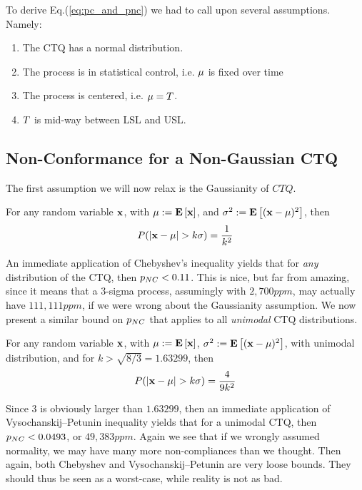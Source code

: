 To derive Eq.(\ref{eq:pc_and_pnc}) we had to call upon several assumptions.
Namely:
\begin{enumerate}
\item The CTQ has a normal distribution.
\item The process is in statistical control, i.e. $\mu$ is fixed over time
\item The process is centered, i.e. $\mu=T$.
\item $T$ is mid-way between LSL and USL.
\end{enumerate}








\subsection{Non-Conformance for a Non-Gaussian CTQ}
The first assumption we will now relax is the Gaussianity of $CTQ$. 

\begin{theorem}
For any random variable $\mathbf{x}$, with $\mu:=\mathbf{E}\left[ \mathbf{x} \right]$, and $\sigma^2:=\mathbf{E}\left[ (\mathbf{x}-\mu)^2 \right]$, then
\begin{align}
	P(|\x-\mu|>k\sigma)=\frac{1}{k^2}
\end{align}
\end{theorem}
An immediate application of Chebyshev's inequality yields that for \emph{any} distribution of the CTQ, then $p_{NC}<0.11$.
This is nice, but far from amazing, since it means that a 3-sigma process, assumingly with $2,700 ppm$, may actually have $111,111 ppm$, if we were wrong about the Gaussianity assumption.
We now present a similar bound on $p_{NC}$ that applies to all \emph{unimodal} CTQ distributions.

\begin{theorem}
For any random variable $\mathbf{x}$, with $\mu:=\mathbf{E}\left[ \mathbf{x} \right]$, $\sigma^2:=\mathbf{E}\left[ (\mathbf{x}-\mu)^2 \right]$, with unimodal distribution, and for $k>\sqrt{8/3}=1.63299$, then 
\begin{align}
	P(|\x-\mu|>k\sigma)=\frac{4}{9 k^2}
\end{align}
\end{theorem}
Since $3$ is obviously larger than $1.63299$, then an immediate application of Vysochanskij–Petunin inequality yields that for a unimodal CTQ, then $p_{NC}<0.0493$, or $49,383 ppm$.
Again we see that if we wrongly assumed normality, we may have many more non-compliances than we thought. Then again, both Chebyshev and Vysochanskij–Petunin are very loose bounds. 
They should thus be seen as a worst-case, while reality is not as bad.

